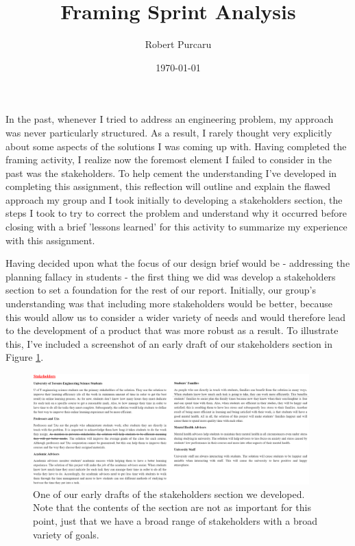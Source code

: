 \documentclass[11pt]{article}
\begin{document}
    \title{Framing Sprint Analysis}
    \author{Robert Purcaru}
    \date{\today}
    \maketitle

    In the past, whenever I tried to address an engineering problem, my approach was never particularly structured. As a result, I rarely thought very explicitly about some aspects of the solutions I was coming up with. Having completed the framing activity, I realize now the foremost element I failed to consider in the past was the stakeholders. To help cement the understanding I've developed in completing this assignment, this reflection will outline and explain the flawed approach my group and I took initially to developing a stakeholders section, the steps I took to try to correct the problem and understand why it occurred before closing with a brief 'lessons learned' for this activity to summarize my experience with this assignment.   

    Having decided upon what the focus of our design brief would be - addressing the planning fallacy in students - the first thing we did was develop a stakeholders section to set a foundation for the rest of our report. Initially, our group's understanding was that including more stakeholders would be better, because this would allow us to consider a wider variety of needs and would therefore lead to the development of a product that was more robust as a result. To illustrate this, I've included a screenshot of an early draft of our stakeholders section in Figure \ref{allStakeholders}. 
    \\
    
    \begin{figure}[H]
        \centering\includegraphics[width = 0.95\textwidth]{AllStakeholders.PNG}
        \caption{One of our early drafts of the stakeholders section we developed. Note that the contents of the section are not as important for this point, just that we have a broad range of stakeholders with a broad variety of goals.}
        \label{allStakeholders}
    \end{figure}
\end{document}
